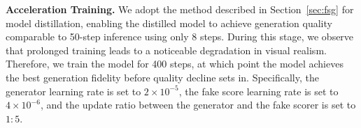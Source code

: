 \noindent\textbf{Acceleration Training.}
We adopt the method described in Section~\ref{sec:fsg} for model distillation, 
enabling the distilled model to achieve generation quality comparable 
to 50-step inference using only 8 steps. During this stage, we observe 
that prolonged training leads to a noticeable degradation in visual 
realism. Therefore, we train the model for 400 steps, at which 
point the model achieves the best generation fidelity before 
quality decline sets in. Specifically, the generator learning rate is 
set to $2 \times 10^{-5}$, the fake score learning rate is set to 
$4 \times 10^{-6}$, and the update ratio between the generator and 
the fake scorer is set to $1\!:\!5$.
